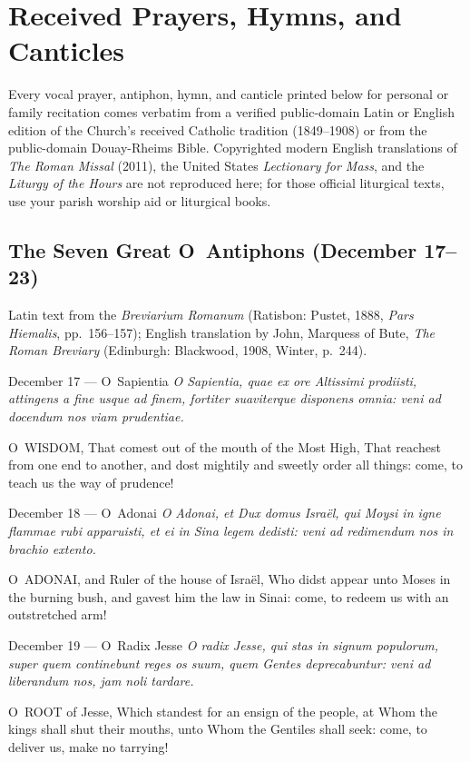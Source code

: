 \section{Received Prayers, Hymns, and Canticles}\label{app:prayers}

Every vocal prayer, antiphon, hymn, and canticle printed below for personal or family recitation comes verbatim from a verified public-domain Latin or English edition of the Church's received Catholic tradition (1849--1908) or from the public-domain Douay-Rheims Bible. Copyrighted modern English translations of \textit{The Roman Missal} (2011), the United States \textit{Lectionary for Mass}, and the \textit{Liturgy of the Hours} are not reproduced here; for those official liturgical texts, use your parish worship aid or liturgical books.

\subsection{The Seven Great O~Antiphons (December 17--23)}

Latin text from the \textit{Breviarium Romanum} (Ratisbon: Pustet, 1888, \textit{Pars Hiemalis}, pp.~156--157); English translation by John, Marquess of Bute, \textit{The Roman Breviary} (Edinburgh: Blackwood, 1908, Winter, p.~244).

\begin{massbox}{December 17 --- O~Sapientia}
\textit{O Sapientia, quae ex ore Altissimi prodiisti, attingens a fine usque ad finem, fortiter suaviterque disponens omnia: veni ad docendum nos viam prudentiae.}

\medskip
O~WISDOM, That comest out of the mouth of the Most High, That reachest from one end to another, and dost mightily and sweetly order all things: come, to teach us the way of prudence!
\end{massbox}

\begin{massbox}{December 18 --- O~Adonai}
\textit{O Adonai, et Dux domus Isra\"el, qui Moysi in igne flammae rubi apparuisti, et ei in Sina legem dedisti: veni ad redimendum nos in brachio extento.}

\medskip
O~ADONAI, and Ruler of the house of Isra\"el, Who didst appear unto Moses in the burning bush, and gavest him the law in Sinai: come, to redeem us with an outstretched arm!
\end{massbox}

\begin{massbox}{December 19 --- O~Radix Jesse}
\textit{O radix Jesse, qui stas in signum populorum, super quem continebunt reges os suum, quem Gentes deprecabuntur: veni ad liberandum nos, jam noli tardare.}

\medskip
O~ROOT of Jesse, Which standest for an ensign of the people, at Whom the kings shall shut their mouths, unto Whom the Gentiles shall seek: come, to deliver us, make no tarrying!
\end{massbox}

